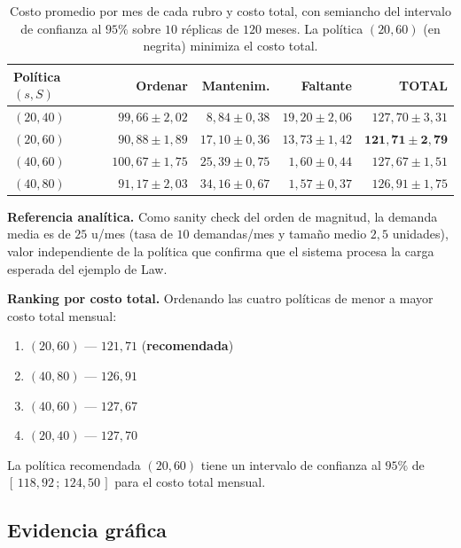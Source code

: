 \documentclass[11pt]{article}
\begin{document}
\begin{table}[H]
\centering
\small
\begin{tabular}{lrrrr}
\toprule
\textbf{Pol\'itica $(s, S)$} & \textbf{Ordenar} & \textbf{Mantenim.}
& \textbf{Faltante} & \textbf{TOTAL} \\
\midrule
$(20, 40)$            & $99{,}66 \pm 2{,}02$  & $8{,}84 \pm 0{,}38$
  & $19{,}20 \pm 2{,}06$ & $127{,}70 \pm 3{,}31$ \\
$(20, 60)$            & $90{,}88 \pm 1{,}89$  & $17{,}10 \pm 0{,}36$
  & $13{,}73 \pm 1{,}42$ & $\mathbf{121{,}71 \pm 2{,}79}$ \\
$(40, 60)$            & $100{,}67 \pm 1{,}75$ & $25{,}39 \pm 0{,}75$
  & $1{,}60 \pm 0{,}44$  & $127{,}67 \pm 1{,}51$ \\
$(40, 80)$            & $91{,}17 \pm 2{,}03$  & $34{,}16 \pm 0{,}67$
  & $1{,}57 \pm 0{,}37$  & $126{,}91 \pm 1{,}75$ \\
\bottomrule
\end{tabular}
\caption{Costo promedio por mes de cada rubro y costo total, con semiancho del
intervalo de confianza al $95\%$ sobre $10$ r\'eplicas de $120$ meses. La
pol\'itica $(20, 60)$ (en negrita) minimiza el costo total.}
\label{tab:resultados}
\end{table}

\textbf{Referencia anal\'itica.} Como sanity check del orden de magnitud, la
demanda media es de $25$ u/mes (tasa de $10$ demandas/mes y tama\~no medio
$2{,}5$ unidades), valor independiente de la pol\'itica que confirma que el
sistema procesa la carga esperada del ejemplo de Law.

\textbf{Ranking por costo total.} Ordenando las cuatro pol\'iticas de menor a
mayor costo total mensual:
\begin{enumerate}
  \item $(20, 60)$ --- $121{,}71$ \quad (\textbf{recomendada})
  \item $(40, 80)$ --- $126{,}91$
  \item $(40, 60)$ --- $127{,}67$
  \item $(20, 40)$ --- $127{,}70$
\end{enumerate}
La pol\'itica recomendada $(20, 60)$ tiene un intervalo de confianza al $95\%$
de $[\,118{,}92\,;\,124{,}50\,]$ para el costo total mensual.

\subsection{Evidencia gr\'afica}
\end{document}
